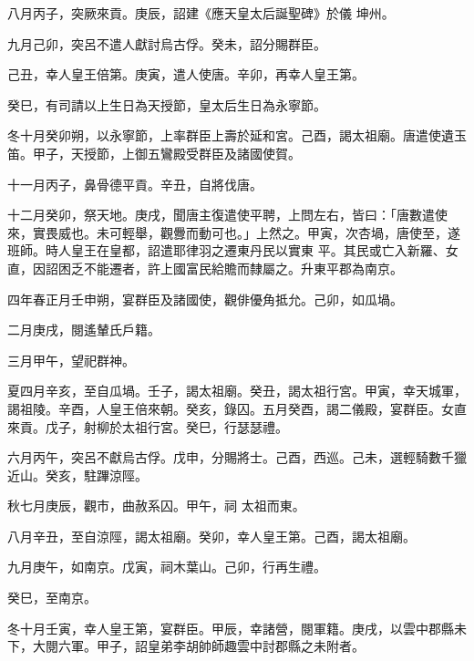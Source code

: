\begin{pinyinscope}
 八月丙子，突厥來貢。庚辰，詔建《應天皇太后誕聖碑》於儀
 坤州。



 九月己卯，突呂不遣人獻討烏古俘。癸未，詔分賜群臣。



 己丑，幸人皇王倍第。庚寅，遣人使唐。辛卯，再幸人皇王第。



 癸巳，有司請以上生日為天授節，皇太后生日為永寧節。



 冬十月癸卯朔，以永寧節，上率群臣上壽於延和宮。己酉，謁太祖廟。唐遣使遺玉笛。甲子，天授節，上御五鸞殿受群臣及諸國使賀。



 十一月丙子，鼻骨德平貢。辛丑，自將伐唐。



 十二月癸卯，祭天地。庚戌，聞唐主復遣使平聘，上問左右，皆曰：「唐數遣使來，實畏威也。未可輕舉，觀釁而動可也。」上然之。甲寅，次杏堝，唐使至，遂班師。時人皇王在皇都，詔遣耶律羽之遷東丹民以實東
 平。其民或亡入新羅、女直，因詔困乏不能遷者，許上國富民給贍而隸屬之。升東平郡為南京。



 四年春正月壬申朔，宴群臣及諸國使，觀俳優角抵允。己卯，如瓜堝。



 二月庚戌，閱遙輦氏戶籍。



 三月甲午，望祀群神。



 夏四月辛亥，至自瓜堝。壬子，謁太祖廟。癸丑，謁太祖行宮。甲寅，幸天城軍，謁祖陵。辛酉，人皇王倍來朝。癸亥，錄囚。五月癸酉，謁二儀殿，宴群臣。女直來貢。戊子，射柳於太祖行宮。癸巳，行瑟瑟禮。



 六月丙午，突呂不獻烏古俘。戊申，分賜將士。己酉，西巡。己未，選輕騎數千獵近山。癸亥，駐蹕涼陘。



 秋七月庚辰，觀市，曲赦系囚。甲午，祠
 太祖而東。



 八月辛丑，至自涼陘，謁太祖廟。癸卯，幸人皇王第。己酉，謁太祖廟。



 九月庚午，如南京。戊寅，祠木葉山。己卯，行再生禮。



 癸巳，至南京。



 冬十月壬寅，幸人皇王第，宴群臣。甲辰，幸諸營，閱軍籍。庚戌，以雲中郡縣未下，大閱六軍。甲子，詔皇弟李胡帥師趣雲中討郡縣之未附者。




\end{pinyinscope}
